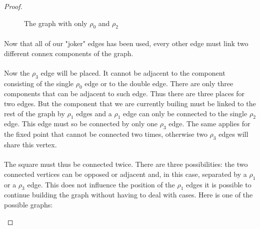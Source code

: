 \begin{proof}
\begin{figure}[H]
\begin{center}
\begin{tikzpicture}[scale=.8]
    \end{tikzpicture}
    \caption{The graph with only $\rho_0$ and $\rho_2$}
  \end{center}
\end{figure}

\paragraph{}
Now that all of our "joker" edges has been used, every other edge must link two different connex components of the graph.

\paragraph{}
Now the $\rho_3$ edge will be placed. It cannot be adjacent to the component consisting of the single $\rho_0$ edge or to the double edge. There are only three components that can be adjacent to such edge. Thus there are three places for two edges. But the component that we are currently builing must be linked to the rest of the graph by $\rho_1$ edges and a $\rho_1$ edge can only be connected to the single $\rho_2$ edge. This edge must so be connected by only one $\rho_3$ edge. The same applies for the fixed point that cannot be connected two times, otherwise two $\rho_3$ edges will share this vertex.

\paragraph{}
The square must thus be connected twice. There are three possibilities: the two connected vertices can be opposed or adjacent and, in this case, separated by a $\rho_1$ or a $\rho_3$ edge. This does not influence the position of the $\rho_1$ edges it is possible to continue building the graph without having to deal with cases. Here is one of the possible graphs:

\begin{figure}[H]
  \begin{center}
\end{center}
\end{figure}
\end{proof}
